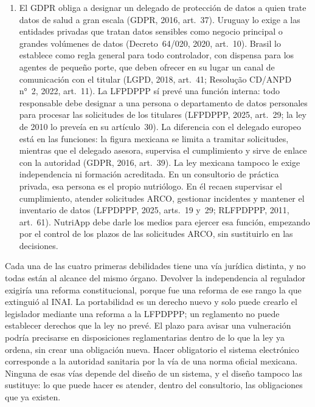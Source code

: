 \documentclass[12pt, a4paper]{article}
\begin{document}
\begin{enumerate}[label=\Roman*.]
  \item El GDPR obliga a designar un delegado de protección de datos
  a quien trate datos de salud a gran escala (GDPR, 2016, art.~37).
  Uruguay lo exige a las entidades privadas que tratan datos
  sensibles como negocio principal o grandes volúmenes de datos
  (Decreto~64/020, 2020, art.~10). Brasil lo establece como regla
  general para todo controlador, con dispensa para los agentes de
  pequeño porte, que
  deben ofrecer en su lugar un canal de comunicación con el titular
  (LGPD, 2018, art.~41; Resolução CD/ANPD n°~2, 2022, art.~11). La
  LFPDPPP sí prevé una función interna: todo responsable debe
  designar a una persona o departamento de datos personales para
  procesar las solicitudes de los titulares (LFPDPPP, 2025, art.~29;
  la ley de 2010 lo preveía en su artículo~30). La diferencia con el
  delegado europeo está en las funciones: la figura mexicana se limita a
  tramitar solicitudes, mientras que el delegado asesora, supervisa el
  cumplimiento y sirve de enlace con la autoridad (GDPR, 2016, art.~39).
  La ley mexicana tampoco le exige independencia ni formación acreditada.
  En un consultorio de práctica privada, esa persona es el propio nutriólogo. En
  él recaen supervisar el cumplimiento, atender solicitudes ARCO,
  gestionar incidentes y mantener el inventario de datos (LFPDPPP, 2025,
  arts.~19 y~29; RLFPDPPP, 2011, art.~61). NutriApp debe darle los
  medios para ejercer esa función, empezando por el control de los plazos
  de las solicitudes ARCO, sin sustituirlo en las decisiones.
 
\end{enumerate}
 
Cada una de las cuatro primeras debilidades tiene una vía jurídica distinta, y no
todas están al alcance del mismo órgano. Devolver la independencia
al regulador exigiría una reforma constitucional, porque fue una
reforma de ese rango la que extinguió al INAI. La portabilidad es un
derecho nuevo y solo puede crearlo el legislador mediante una
reforma a la LFPDPPP; un reglamento no puede establecer derechos que
la ley no prevé. El plazo para avisar una vulneración podría
precisarse en disposiciones reglamentarias dentro de lo que la ley
ya ordena, sin crear una obligación nueva. Hacer obligatorio el
sistema electrónico corresponde a la autoridad sanitaria por la vía
de una norma oficial mexicana. Ninguna de esas vías depende del
diseño de un sistema, y el diseño tampoco las sustituye: lo que
puede hacer es atender, dentro del consultorio, las obligaciones que
ya existen.
 
\end{document}
